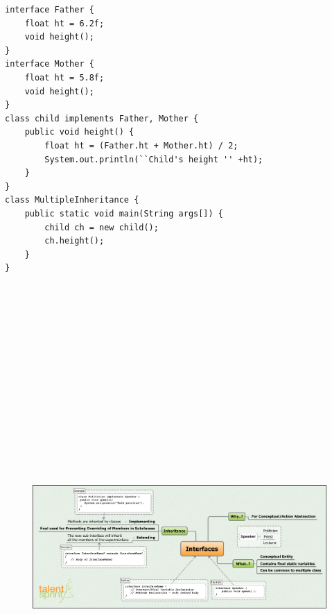 \documentclass[11pt,a4paper]{article}
\begin{document}
\begin{lstlisting}[numbers=none]
interface Father {
    float ht = 6.2f;
    void height();
}
interface Mother {
    float ht = 5.8f;
    void height();
}
class child implements Father, Mother {
    public void height() {
        float ht = (Father.ht + Mother.ht) / 2;
        System.out.println(``Child's height '' +ht);
    }
}
class MultipleInheritance {
    public static void main(String args[]) {
        child ch = new child();
        ch.height();
    }
}
\end{lstlisting}
\begin{figure}[H]
 \begin{center}
   \includegraphics[angle=90,height=20cm, width=13cm]{Interfaces.png}
 \end{center}
 \end{figure}
\end{document}

